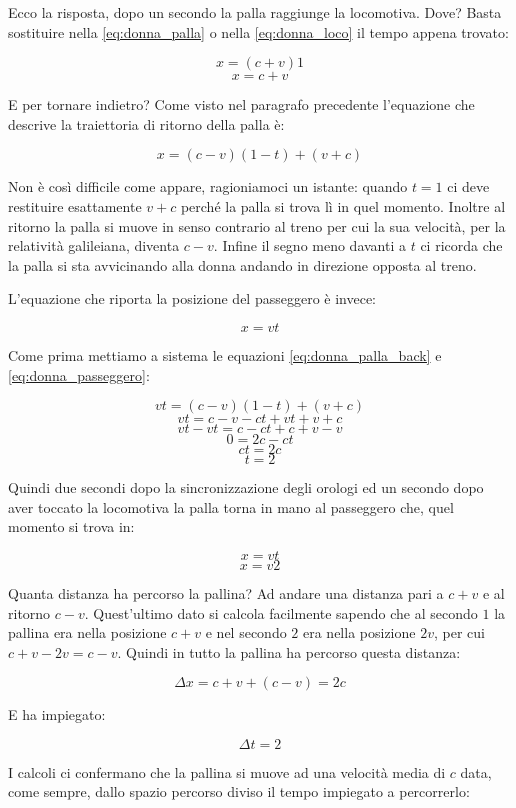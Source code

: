 Ecco la risposta, dopo un secondo la palla raggiunge la locomotiva. Dove? Basta sostituire nella \ref{eq:donna_palla} o nella \ref{eq:donna_loco} il tempo appena trovato:

$$ x=(c+v)1 $$
$$ x=c+v $$

E per tornare indietro? Come visto nel paragrafo precedente  l'equazione che descrive la traiettoria di ritorno della palla è:

\begin{equation} \label{eq:donna_palla_back} 
  x = (c-v)(1-t) + (v+c)
\end{equation}

Non è così difficile come appare, ragioniamoci un istante: quando $t=1$ ci deve restituire esattamente $v+c$ perché la palla si trova lì in quel momento. Inoltre al ritorno la palla si muove in senso contrario al treno per cui la sua velocità, per la relatività galileiana, diventa $c-v$. Infine il segno meno davanti a $t$ ci ricorda che la palla si sta avvicinando alla donna andando in direzione opposta al treno. 

L'equazione che riporta la posizione del passeggero è invece:

\begin{equation} \label{eq:donna_passeggero} 
   x = vt
\end{equation}


Come prima mettiamo a sistema le equazioni \ref{eq:donna_palla_back} e \ref{eq:donna_passeggero}:

$$ vt = (c-v)(1-t) + (v+c) $$
$$ vt = c-v -ct + vt + v+c $$
$$ vt -vt = c -ct +c +v -v $$
$$ 0 =  2c - ct  $$
$$ ct =  2c $$
$$ t =2 $$

Quindi due secondi dopo la sincronizzazione degli orologi ed un secondo dopo aver toccato la locomotiva la palla torna in mano al passeggero che, quel momento si trova in:

$$ x = vt $$
$$ x = v2 $$

Quanta distanza ha percorso la pallina? Ad andare una distanza pari a $c+v$ e  al ritorno $c-v$. Quest'ultimo dato si calcola facilmente sapendo che al secondo $1$ la pallina era nella posizione $c+v$ e nel secondo $2$ era nella posizione $2v$, per cui $c+v-2v=c-v$. Quindi in tutto la pallina ha percorso questa distanza:

$$\Delta x = c+v + (c-v) = 2c $$

E ha impiegato:

$$\Delta t = 2 $$

I calcoli ci confermano che la pallina si muove ad una velocità media di $c$ data, come sempre, dallo spazio percorso diviso il tempo impiegato a percorrerlo:

